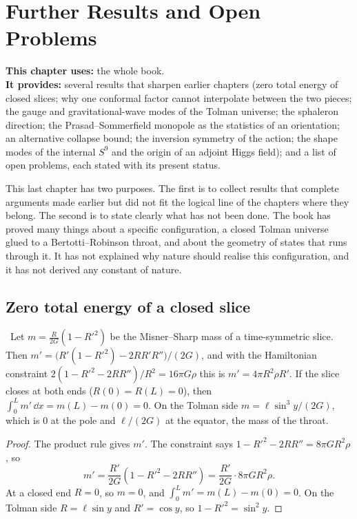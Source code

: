 \chapter{Further Results and Open Problems}
\label{ch:open}

\begin{usesbox}
\textbf{This chapter uses:} the whole book.\\
\textbf{It provides:} several results that sharpen earlier chapters (zero total energy of closed slices; why one conformal factor cannot interpolate between the two pieces; the gauge and gravitational-wave modes of the Tolman universe; the sphaleron direction; the Prasad--Sommerfield monopole as the statistics of an orientation; an alternative collapse bound; the inversion symmetry of the action; the shape modes of the internal $S^9$ and the origin of an adjoint Higgs field); and a list of open problems, each stated with its present status.
\end{usesbox}

This last chapter has two purposes. The first is to collect results that complete arguments made earlier but did not fit the logical line of the chapters where they belong. The second is to state clearly what has not been done. The book has proved many things about a specific configuration, a closed Tolman universe glued to a Bertotti--Robinson throat, and about the geometry of states that runs through it. It has not explained why nature should realise this configuration, and it has not derived any constant of nature.

\section{Zero total energy of a closed slice}

\begin{proposition}\label{prop:zeroenergy}\ver\
Let $m=\frac R{2G}(1-R'^2)$ be the Misner--Sharp mass of a time-symmetric slice. Then $m'=\bigl(R'(1-R'^2)-2RR'R''\bigr)/(2G)$, and with the Hamiltonian constraint $2(1-R'^2-2RR'')/R^2=16\pi G\rho$ this is $m'=4\pi R^2\rho R'$. If the slice closes at both ends ($R(0)=R(L)=0$), then $\int_0^Lm'\,\dd x=m(L)-m(0)=0$. On the Tolman side $m=\ell\sin^3y/(2G)$, which is $0$ at the pole and $\ell/(2G)$ at the equator, the mass of the throat.
\end{proposition}
\begin{proof}
The product rule gives $m'$. The constraint says $1-R'^2-2RR''=8\pi GR^2\rho$, so
\[
m'=\frac{R'}{2G}(1-R'^2-2RR'')=\frac{R'}{2G}\cdot8\pi GR^2\rho .
\]
At a closed end $R=0$, so $m=0$, and $\int_0^Lm'=m(L)-m(0)=0$. On the Tolman side $R=\ell\sin y$ and $R'=\cos y$, so $1-R'^2=\sin^2y$.
\end{proof}


